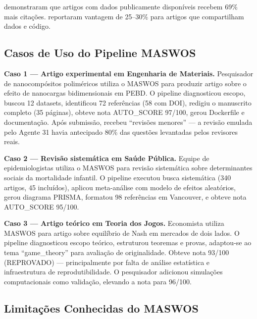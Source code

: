  demonstraram que artigos com
dados publicamente disponíveis recebem 69\% mais citações.
 reportaram vantagem de
25--30\% para artigos que compartilham dados e código.


\subsection{Casos de Uso do Pipeline MASWOS}
\label{sec:casos_uso}

\textbf{Caso 1 — Artigo experimental em Engenharia de Materiais.}
Pesquisador de nanocompósitos poliméricos utiliza o MASWOS para
produzir artigo sobre o efeito de nanocargas bidimensionais em
PEBD. O pipeline diagnosticou escopo, buscou 12 datasets, identificou
72 referências (58 com DOI), redigiu o manuscrito completo (35
páginas), obteve nota AUTO\_SCORE 97/100, gerou Dockerfile e
documentação. Após submissão, recebeu ``revisões menores'' — a
revisão emulada pelo Agente 31 havia antecipado 80\% das questões
levantadas pelos revisores reais.

\textbf{Caso 2 — Revisão sistemática em Saúde Pública.} Equipe de
epidemiologistas utiliza o MASWOS para revisão sistemática sobre
determinantes sociais da mortalidade infantil. O pipeline executou
busca sistemática (340 artigos, 45 incluídos), aplicou meta-análise
com modelo de efeitos aleatórios, gerou diagrama PRISMA, formatou
98 referências em Vancouver, e obteve nota AUTO\_SCORE 95/100.

\textbf{Caso 3 — Artigo teórico em Teoria dos Jogos.} Economista
utiliza MASWOS para artigo sobre equilíbrio de Nash em mercados de
dois lados. O pipeline diagnosticou escopo teórico, estruturou
teoremas e provas, adaptou-se ao tema ``game\_theory'' para
avaliação de originalidade. Obteve nota 93/100 (REPROVADO) —
principalmente por falta de análise estatística e infraestrutura de
reprodutibilidade. O pesquisador adicionou simulações
computacionais como validação, elevando a nota para 96/100.

\subsection{Limitações Conhecidas do MASWOS}
\label{sec:limitacoes_finais}

